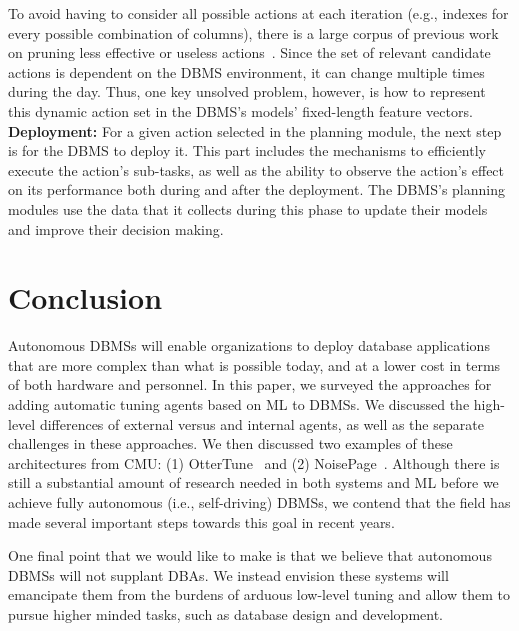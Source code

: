 \documentclass[11pt,times]{article}
\newcommand{\ottertune}{OtterTune\xspace}
\newcommand{\noisepage}{NoisePage\xspace}
\begin{document}
To avoid having to consider all possible actions at each iteration (e.g., indexes for every 
possible combination of columns), there is a large corpus of previous work on pruning less effective 
or useless actions~\cite{chaudhuri07}. Since the set of relevant candidate actions is dependent on 
the DBMS environment, it can change multiple times during the day. Thus, one key unsolved problem, 
however, is how to represent this dynamic action set in the DBMS's models' fixed-length feature 
vectors.
\vspace*{-0.1in} \\

\textbf{Deployment:}
For a given action selected in the planning module, the next step is for the DBMS to deploy it. 
This part includes the mechanisms to efficiently execute the action's sub-tasks, as well as the 
ability to observe the action's effect on its performance both during and after the 
deployment. The DBMS's planning modules use the data that it collects during this phase 
to update their models and improve their decision making.

\section{Conclusion}
\label{sec:conclusion}
Autonomous DBMSs will enable organizations to deploy database applications that are more 
complex than what is possible today, and at a lower cost in terms of both hardware and personnel. 
In this paper, we surveyed the approaches for adding automatic tuning agents based on ML to 
DBMSs. We discussed the high-level differences of external versus and internal agents, as well as 
the separate challenges in these approaches. We then discussed two examples of these architectures 
from CMU: (1) \ottertune~\cite{ottertune} and (2) \noisepage~\cite{noisepage}. Although there is 
still a substantial amount of research needed in both systems and ML before we achieve fully 
autonomous (i.e., self-driving) DBMSs, we contend that the field has made several important steps 
towards this goal in recent years.

One final point that we would like to make is that we believe that autonomous DBMSs will not 
supplant DBAs. We instead envision these systems will emancipate them from the burdens of 
arduous low-level tuning and allow them to pursue higher minded tasks, such as database 
design and development.
\end{document}
